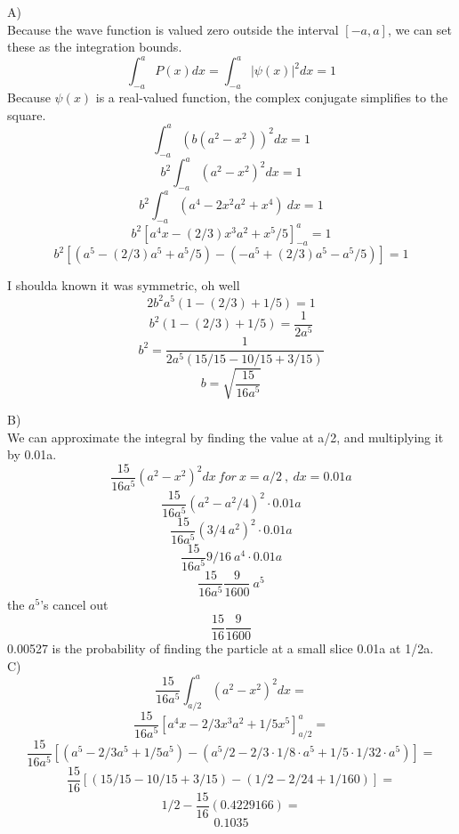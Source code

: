 \documentclass{article}
\begin{document}
A)\\
Because the wave function is valued zero outside the interval $\left[-a, a\right]$, we can set these as the integration bounds.
$$ \int_{-a}^a P(x) dx = \int_{-a}^a |\psi(x)|^2 dx = 1 $$
Because $\psi(x)$ is a real-valued function, the complex conjugate simplifies to the square.
$$ \int_{-a}^a (b(a^2 - x^2))^2 dx = 1 $$
$$ b^2 \int_{-a}^a (a^2 - x^2)^2 dx = 1 $$
$$ b^2 \int_{-a}^a (a^4 - 2x^2a^2 + x^4)\ dx = 1 $$
$$ b^2 \left[a^4x - (2/3)x^3a^2 + x^5/5 \right]^a_{-a} = 1 $$
$$ b^2 \left[ \left(a^5 - (2/3)a^5 + a^5/5 \right) - \left(-a^5 + (2/3)a^5 - a^5/5 \right) \right] = 1 $$

I shoulda known it was symmetric, oh well
$$ 2b^2 a^5 \left(1 - (2/3) + 1/5 \right) = 1 $$
$$ b^2 \left(1 - (2/3) + 1/5 \right) = \frac{1}{2a^5} $$
$$ b^2  = \frac{1}{2a^5(15/15 - 10/15 + 3/15)} $$
$$ b  = \sqrt{\frac{15}{16a^5}} $$

B)\\
We can approximate the integral by finding the value at a/2, and multiplying it by 0.01a. 
$$ \frac{15}{16a^5} (a^2 - x^2)^2 dx \ for\ x = a/2\ ,\ dx = 0.01a $$
$$ \frac{15}{16a^5} (a^2 - a^2/4)^2 \cdot 0.01a $$
$$ \frac{15}{16a^5} (3/4\ a^2)^2 \cdot 0.01a $$
$$ \frac{15}{16a^5} 9/16\ a^4 \cdot 0.01a $$
$$ \frac{15}{16a^5} \frac{9}{1600}\ a^5 $$
the $a^5$'s cancel out
$$ \frac{15}{16} \frac{9}{1600} $$
0.00527 is the probability of finding the particle at a small slice 0.01a at 1/2a.\\

\newpage
C)\\
$$ \frac{15}{16a^5} \int_{a/2}^a (a^2 - x^2)^2 dx = $$
$$ \frac{15}{16a^5} \left[a^4x - 2/3 x^3a^2 + 1/5 x^5 \right]^a_{a/2} = $$
$$ \frac{15}{16a^5} \left[(a^5 - 2/3 a^5 + 1/5 a^5) - (a^5/2 - 2/3 \cdot 1/8 \cdot a^5 + 1/5 \cdot 1/32 \cdot a^5) \right] = $$
$$ \frac{15}{16} \left[(15/15 - 10/15 + 3/15) - (1/2 - 2/24 + 1/160) \right] = $$
$$ 1/2 - \frac{15}{16}(0.4229166) = $$
$$ 0.1035 $$
\end{document}
